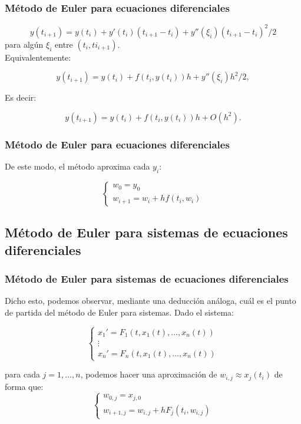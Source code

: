 \documentclass{beamer}
\begin{document}
\begin{frame}
	\frametitle{Método de Euler para ecuaciones diferenciales}
	$$
	y(t_{i+1})=y(t_i) + y'(t_i)(t_{i+1}-t_i) + y''(\xi_i)(t_{i+1}-t_i)^2/2
	$$ para algún $\xi_i$ entre $(t_i, ti_{i+1})$.\\
	Equivalentemente:
	
	$$
	y(t_{i+1})=y(t_i) + f(t_i,y(t_i))h + y''(\xi_i)h^2/2,
	$$
	
	Es decir: 
	
	$$
	y(t_{i+1})=y(t_i) + f(t_i,y(t_i))h + O(h^2).
	$$ 
	
\end{frame}

\begin{frame}
	\frametitle{Método de Euler para ecuaciones diferenciales}
	
	De este modo, el método aproxima cada $y_i$:
	
	$$
	\begin{cases}
	w_0=y_0\\
	w_{i+1}=w_i + hf(t_i,w_i)
	\end{cases}
	$$
\end{frame}

\subsection{Método de Euler para sistemas de ecuaciones diferenciales}
\begin{frame}
	\frametitle{Método de Euler para sistemas de ecuaciones diferenciales}
	
	Dicho esto, podemos observar, mediante una deducción análoga, cuál es el punto de partida del método de Euler para sistemas. Dado el sistema:
	
	$$
	\begin{cases}
	x_1'=F_1(t,x_1(t),...,x_n(t)) \\
	\vdots\\
	x_n'=F_n(t,x_1(t),...,x_n(t))
	\end{cases}
	$$
	
 para cada $j=1,...,n$, podemos hacer una aproximación de $w_{i,j} \approx x_j(t_i)$ de forma que:
 $$
 \begin{cases}
 w_{0,j}=x_{j,0} \\
 w_{i+1,j}=w_{i,j}+ hF_j(t_i,w_{i,j})
 \end{cases}
 $$ 
\end{frame}
\end{document}
